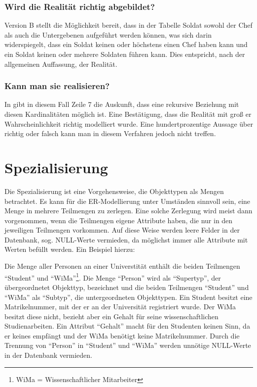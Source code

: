           \subsubsection{Wird die Realität richtig abgebildet?}
            Version B stellt die Möglichkeit bereit, dass in der Tabelle Soldat sowohl der Chef als auch die Untergebenen aufgeführt werden können, was sich darin widerspiegelt, dass ein Soldat keinen oder höchstens einen Chef haben kann und ein Soldat keinen oder mehrere Soldaten führen kann. Dies entspricht, nach der allgemeinen Auffassung, der Realität.
          \subsubsection{Kann man sie realisieren?}
            In  gibt in diesem Fall Zeile 7 die Auskunft, dass eine rekursive Beziehung mit diesen Kardinalitäten möglich ist. Eine Bestätigung, dass die Realität mit groß er Wahrscheinlichkeit richtig modelliert wurde. Eine hundertprozentige Aussage über richtig oder falsch kann man in diesem Verfahren jedoch nicht treffen.
    \section{Spezialisierung}
      \label{specialization}
       Die Spezialisierung ist eine Vorgehensweise, die Objekttypen als Mengen
       betrachtet. Es kann für die ER-Modellierung unter Umständen sinnvoll
       sein, eine Menge in mehrere Teilmengen zu zerlegen. Eine solche Zerlegung
       wird meist dann vorgenommen, wenn die Teilmengen eigene Attribute haben,
       die nur in den jeweiligen Teilmengen vorkommen. Auf diese Weise werden
       leere Felder in der Datenbank, sog. NULL-Werte vermieden, da möglichst
       immer alle Attribute mit Werten befüllt werden. Ein Beispiel hierzu:

       Die Menge aller Personen an einer Universtität enthält die beiden
       Teilmengen \enquote{Student} und \enquote{WiMa}\footnote{WiMa =
       Wissenschaftlicher Mitarbeiter}. Die Menge \enquote{Person} wird als
       \enquote{Supertyp}, der übergeordnetet Objekttyp, bezeichnet und die
       beiden Teilmengen \enquote{Student} und \enquote{WiMa} als
       \enquote{Subtyp}, die untergeordneten Objekttypen.
       Ein Student besitzt eine Matrikelnummer, mit der er an der Universität
       registriert wurde. Der WiMa besitzt diese nicht, bezieht aber ein Gehalt
       für seine wissenschaftlichen Studienarbeiten. Ein Attribut
       \enquote{Gehalt} macht für den Studenten keinen Sinn, da er keines
       empfängt und der WiMa benötigt keine Matrikelnummer. Durch die
       Trennung von \enquote{Person} in \enquote{Student} und \enquote{WiMa}
       werden unnötige NULL-Werte in der Datenbank vermieden.

